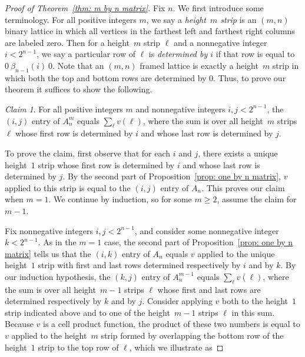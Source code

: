 \documentclass[12pt]{article}
\theoremstyle{plain}
\providecommand{\claimname}{Claim}
\theoremstyle{remark}
\newtheorem*{claim*}{\protect\claimname}
\theoremstyle{definition}
\theoremstyle{remark}
\theoremstyle{definition}
\begin{document}
\begin{proof}[Proof of Theorem~\ref{thm: m by n matrix}]
Fix $n$. We first introduce some terminology. For all positive integers $m$, we say a \emph{height~$m$ strip} is an $\left(m,n\right)$ binary lattice in which all vertices in the farthest left and farthest right columns are labeled zero. Then for a height~$m$ strip $\ell$ and a nonnegative integer $i<2^{n-1}$, we say a particular row of $\ell$ is \emph{determined by $i$} if that row is equal to $0\ \beta_{n-1}\left(i\right)\ 0$. Note that an $\left(m,n\right)$ framed lattice is exactly a height~$m$ strip in which both the top and bottom rows are determined by $0$. Thus, to prove our theorem it suffices to show the following. \begin{claim*} For all positive integers $m$ and nonnegative integers $i,j<2^{n-1}$, the $\left(i,j\right)$ entry of $A^{m}_{n}$ equals $\sum_{\ell}v\left(\ell\right)$, where the sum is over all height~$m$ strips $\ell$ whose first row is determined by $i$ and whose last row is determined by $j$.  \end{claim*} To prove the claim, first observe that for each $i$ and $j$, there exists a unique height~$1$ strip whose first row is determined by $i$ and whose last row is determined by $j$. By the second part of Proposition~\ref{prop: one by n matrix}, $v$ applied to this strip is equal to the $\left(i,j\right)$ entry of $A_{n}$. This proves our claim when $m=1$. We continue by induction, so for some $m\ge2$, assume the claim for $m-1$.

Fix nonnegative integers $i,j<2^{n-1}$, and consider some nonnegative integer $k<2^{n-1}$. As in the $m=1$ case, the second part of Proposition~\ref{prop: one by n matrix} tells us that the $\left(i,k\right)$ entry of $A_{n}$ equals $v$ applied to the unique height~$1$ strip with first and last rows determined respectively by $i$ and by $k$. By our induction hypothesis, the $\left(k,j\right)$ entry of $A^{m-1}_{n}$ equals $\sum_{\ell}v\left(\ell\right)$, where the sum is over all height~$m-1$ strips $\ell$ whose first and last rows are determined respectively by $k$ and by $j$. Consider applying $v$ both to the height~$1$ strip indicated above and to one of the height~$m-1$ strips $\ell$ in this sum. Because $v$ is a cell product function, the product of these two numbers is equal to $v$ applied to the height~$m$ strip formed by overlapping the bottom row of the height~$1$ strip to the top row of $\ell$, which we illustrate as


\end{proof}
\end{document}
